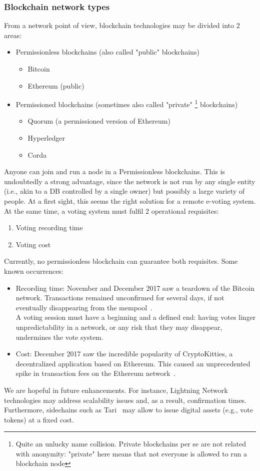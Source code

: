 \documentclass[10pt, letterpaper]{article}
\begin{document}
\subsubsection{Blockchain network types}
From a network point of view, blockchain technologies may be divided into 2 areas:
\begin{itemize}
\item Permissionless blockchains (also called "public" blockchains)
\begin{itemize}
\item Bitcoin
\item Ethereum (public)
\end{itemize}
\item Permissioned blockchains (sometimes also called "private" \footnote{Quite an unlucky name collision. Private blockchains per se are not related with anonymity: "private" here means that not everyone is allowed to run a blockchain node} blockchains)
\begin{itemize}
\item Quorum (a permissioned version of Ethereum)
\item Hyperledger
\item Corda
\end{itemize}
\end{itemize}
Anyone can join and run a node in a Permissionless blockchains. This is undoubtedly a strong advantage, since the network is not run by any single entity (i.e., akin to a DB controlled by a single owner) but possibly a large variety of people. At a first sight, this seems the right solution for a remote e-voting system.
At the same time, a voting system must fulfil 2 operational requisites:
\begin{enumerate}
\item Voting recording time
\item Voting cost
\end{enumerate}
Currently, no permissionless blockchain can guarantee both requisites. Some known occurrences:
\begin{itemize}
\item Recording time: November and December 2017 saw a teardown of the Bitcoin network. Transactions remained unconfirmed for several days, if not eventually disappearing from the mempool~\cite{CCN:700M:11-Nov-2017:Online}.\\
A voting session must have a beginning and a defined end: having votes linger	unpredictability in a network, or any risk that they may disappear, undermines the vote system.
\item Cost: December 2017 saw the incredible popularity of CryptoKitties, a decentralized application based on Ethereum. This caused an unprecedented spike in transaction fees on the Ethereum network~\cite{HackerNoon:CryptoKitties:15-Dec-2017:Online}.\\
\end{itemize}
We are hopeful in future enhancements. For instance, Lightning Network~\cite{LightningNetwork:Online} technologies may address scalability issues and, as a result, confirmation times. Furthermore, sidechains such as Tari~\cite{Tari:Online} may allow to issue digital assets (e.g., vote tokens) at a fixed cost.
\bigskip
\end{document}
